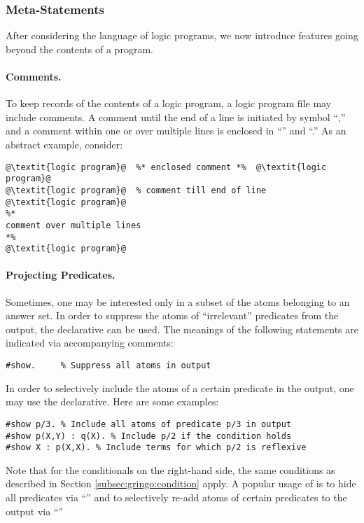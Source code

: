 \subsubsection{Meta-Statements}\label{subsec:gringo:meta}

After considering the language of logic programs,
we now introduce features going beyond the contents of a program.

\paragraph{Comments.}
To keep records of the contents of a logic program,
a logic program file may include comments.
A comment until the end of a line is initiated by symbol ``\code{\%},''
and a comment within one or over multiple lines is enclosed
in ``\code{\%*}'' and ``\code{*\%}.''
As an abstract example, consider:
%
\begin{lstlisting}[numbers=none,escapechar=@]
@\textit{logic program}@  %* enclosed comment *%  @\textit{logic program}@
@\textit{logic program}@  % comment till end of line
@\textit{logic program}@
%*
comment over multiple lines
*%
@\textit{logic program}@
\end{lstlisting}

\paragraph{Projecting Predicates.}
%
Sometimes, one may be interested only in a subset of the atoms belonging
to an answer set.
In order to suppress the atoms of ``irrelevant'' predicates from the output,
the  declarative can be used.
The meanings of the following statements are indicated via accompanying comments:
%
\begin{lstlisting}[numbers=none]
#show.     % Suppress all atoms in output
\end{lstlisting}

In order to selectively include the atoms of a certain predicate in the output,
one may use the  declarative.
Here are some examples:
%
\begin{lstlisting}[numbers=none]
#show p/3. % Include all atoms of predicate p/3 in output
#show p(X,Y) : q(X). % Include p/2 if the condition holds
#show X : p(X,X). % Include terms for which p/2 is reflexive 
\end{lstlisting}
%
Note that for the conditionals on the right-hand side, 
the same conditions as described in Section \ref{subsec:gringo:condition} apply.
%
A popular usage of  is to hide all predicates
via ``'' and to selectively re-add atoms of certain predicates
 to the output via ``''

